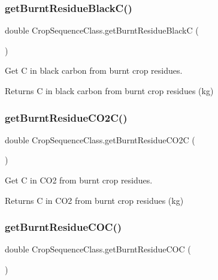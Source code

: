 \subsubsection{\texorpdfstring{getBurntResidueBlackC()}{getBurntResidueBlackC()}}
{\footnotesize\ttfamily double Crop\+Sequence\+Class.\+get\+Burnt\+Residue\+BlackC (\begin{DoxyParamCaption}{ }\end{DoxyParamCaption})\hspace{0.3cm}{\ttfamily [inline]}}



Get C in black carbon from burnt crop residues. 

\begin{DoxyReturn}{Returns}
C in black carbon from burnt crop residues (kg) 
\end{DoxyReturn}
\mbox{\label{class_crop_sequence_class_a848837241cb4bfeab78ddd81becca5e2}} 
\subsubsection{\texorpdfstring{getBurntResidueCO2C()}{getBurntResidueCO2C()}}
{\footnotesize\ttfamily double Crop\+Sequence\+Class.\+get\+Burnt\+Residue\+C\+O2C (\begin{DoxyParamCaption}{ }\end{DoxyParamCaption})\hspace{0.3cm}{\ttfamily [inline]}}



Get C in C\+O2 from burnt crop residues. 

\begin{DoxyReturn}{Returns}
C in C\+O2 from burnt crop residues (kg) 
\end{DoxyReturn}
\mbox{\label{class_crop_sequence_class_abd6622d0f4e91774943475f725877b0b}} 
\subsubsection{\texorpdfstring{getBurntResidueCOC()}{getBurntResidueCOC()}}
{\footnotesize\ttfamily double Crop\+Sequence\+Class.\+get\+Burnt\+Residue\+C\+OC (\begin{DoxyParamCaption}{ }\end{DoxyParamCaption})\hspace{0.3cm}{\ttfamily [inline]}}



